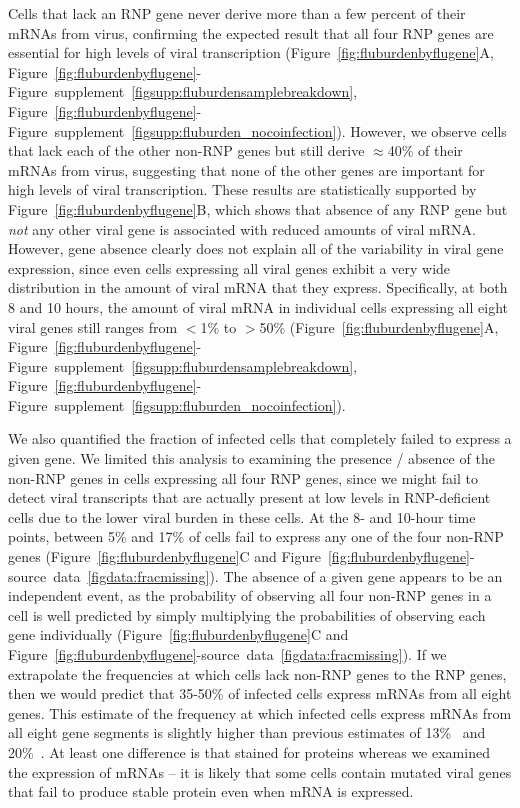 \documentclass[9pt,lineno]{elife}
\begin{document}
Cells that lack an RNP gene never derive more than a few percent of their mRNAs from virus, confirming the expected result that all four RNP genes are essential for high levels of viral transcription (Figure~\ref{fig:fluburdenbyflugene}A, Figure~\ref{fig:fluburdenbyflugene}-Figure~supplement~\ref{figsupp:fluburdensamplebreakdown}, Figure~\ref{fig:fluburdenbyflugene}-Figure~supplement~\ref{figsupp:fluburden_nocoinfection}).
However, we observe cells that lack each of the other non-RNP genes but still derive $\approx$40\% of their mRNAs from virus, suggesting that none of the other genes are important for high levels of viral transcription.
These results are statistically supported by Figure~\ref{fig:fluburdenbyflugene}B, which shows that absence of any RNP gene but \emph{not} any other viral gene is associated with reduced amounts of viral mRNA. 
However, gene absence clearly does not explain all of the variability in viral gene expression, since even cells expressing all viral genes exhibit a very wide distribution in the amount of viral mRNA that they express.
Specifically, at both 8 and 10 hours, the amount of viral mRNA in individual cells expressing all eight viral genes still ranges from $<$1\% to $>$50\% (Figure~\ref{fig:fluburdenbyflugene}A, Figure~\ref{fig:fluburdenbyflugene}-Figure~supplement~\ref{figsupp:fluburdensamplebreakdown}, Figure~\ref{fig:fluburdenbyflugene}-Figure~supplement~\ref{figsupp:fluburden_nocoinfection}).   

We also quantified the fraction of infected cells that completely failed to express a given gene.
We limited this analysis to examining the presence / absence of the non-RNP genes in cells expressing all four RNP genes, since we might fail to detect viral transcripts that are actually present at low levels in RNP-deficient cells due to the lower viral burden in these cells.
At the 8- and 10-hour time points, between 5\% and 17\% of cells fail to express any one of the four non-RNP genes (Figure~\ref{fig:fluburdenbyflugene}C and Figure~\ref{fig:fluburdenbyflugene}-source~data~\ref{figdata:fracmissing}).
The absence of a given gene appears to be an independent event, as the probability of observing all four non-RNP genes in a cell is well predicted by simply multiplying the probabilities of observing each gene individually (Figure~\ref{fig:fluburdenbyflugene}C and Figure~\ref{fig:fluburdenbyflugene}-source~data~\ref{figdata:fracmissing}). 
If we extrapolate the frequencies at which cells lack non-RNP genes to the RNP genes, then we would predict that 35-50\% of infected cells express mRNAs from all eight genes.
This estimate of the frequency at which infected cells express mRNAs from all eight gene segments is slightly higher than previous estimates of 13\%~\citep{Brooke:2013kb} and 20\%~\citep{Dou:2017cp}.
At least one difference is that \citet{Brooke:2013kb} stained for proteins whereas we examined the expression of mRNAs -- it is likely that some cells contain mutated viral genes that fail to produce stable protein even when mRNA is expressed.
	
\end{document}
